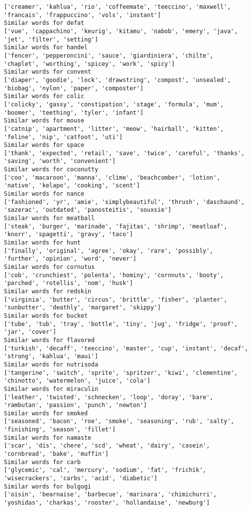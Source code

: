 \documentclass[11pt]{article}
\begin{document}
\begin{Verbatim}[commandchars=\\\{\}]
['creamer', 'kahlua', 'rio', 'coffeemate', 'teeccino', 'maxwell', 'francais', 'frappuccino', 'vols', 'instant']
Similar words for defat
['vue', 'cappachino', 'keurig', 'kitamu', 'nabob', 'emery', 'java', 'jet', 'filter', 'setting']
Similar words for handel
['fencer', 'pepperoncini', 'sauce', 'giardiniera', 'chilte', 'chaplet', 'worthing', 'spicey', 'work', 'spicy']
Similar words for convent
['diaper', 'goodie', 'lock', 'drawstring', 'compost', 'unsealed', 'biobag', 'nylon', 'paper', 'composter']
Similar words for colic
['colicky', 'gassy', 'constipation', 'stage', 'formula', 'mum', 'boomer', 'teething', 'tyler', 'infant']
Similar words for mouse
['catnip', 'apartment', 'litter', 'meow', 'hairball', 'kitten', 'feline', 'nip', 'catfoot', 'uti']
Similar words for space
['thank', 'expected', 'retail', 'save', 'twice', 'careful', 'thanks', 'saving', 'worth', 'convenient']
Similar words for coconutty
['coo', 'macaroon', 'manna', 'clime', 'beachcomber', 'lotion', 'native', 'kelapo', 'cooking', 'scent']
Similar words for nance
['fashioned', 'yr', 'amie', 'simplybeautiful', 'thrush', 'daschaund', 'sazerac', 'outdated', 'panosteitis', 'souxsie']
Similar words for meatball
['steak', 'burger', 'marinade', 'fajitas', 'shrimp', 'meatloaf', 'knorr', 'spagetti', 'gravy', 'taco']
Similar words for hunt
['finally', 'original', 'agree', 'okay', 'rare', 'possibly', 'further', 'opinion', 'word', 'never']
Similar words for cornutus
['cob', 'crunchiest', 'polenta', 'hominy', 'cornnuts', 'booty', 'parched', 'rotellis', 'nom', 'husk']
Similar words for redskin
['virginia', 'butter', 'circus', 'brittle', 'fisher', 'planter', 'sunbutter', 'deathly', 'margaret', 'skippy']
Similar words for bucket
['tube', 'tub', 'tray', 'bottle', 'tiny', 'jug', 'fridge', 'proof', 'jar', 'cover']
Similar words for flavored
['turkish', 'decaff', 'teeccino', 'master', 'cup', 'instant', 'decaf', 'strong', 'kahlua', 'maui']
Similar words for nutrisoda
['tangerine', 'switch', 'sprite', 'spritzer', 'kiwi', 'clementine', 'chinotto', 'watermelon', 'juice', 'cola']
Similar words for miraculin
['leather', 'twisted', 'schnecken', 'loop', 'doray', 'bare', 'rambutan', 'passion', 'punch', 'newton']
Similar words for smoked
['seasoned', 'bacon', 'roe', 'smoke', 'seasoning', 'rub', 'salty', 'finishing', 'season', 'fillet']
Similar words for namaste
['scar', 'dis', 'chere', 'scd', 'wheat', 'dairy', 'casein', 'cornbread', 'bake', 'muffin']
Similar words for carb
['glycemic', 'cal', 'mercury', 'sodium', 'fat', 'frichik', 'wisecrackers', 'carbs', 'acid', 'diabetic']
Similar words for bulgogi
['oisin', 'bearnaise', 'barbecue', 'marinara', 'chimichurri', 'yoshidas', 'charkas', 'rooster', 'hollandaise', 'newburg']

\end{Verbatim}
\end{document}
